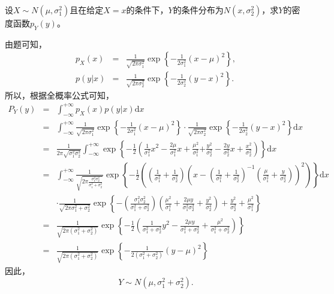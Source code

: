 \begin{example}
设$X\sim N(\mu,\sigma_{1}^{2})$且在给定$X = x$的条件下，$Y$的条件分布为$N(x,\sigma_{2}^{2})$，求$Y$的密度函数$p_{Y}(y)$。
\end{example}
\begin{solution}
由题可知，
\begin{eqnarray*}
    p_X(x) &=& \frac{1}{\sqrt{2\pi \sigma_1^2}} \exp\left\{-\frac{1}{2\sigma_1^2} (x-\mu)^2\right\},\\
    p(y|x) &=& \frac{1}{\sqrt{2\pi \sigma_2^2}}
    \exp\left\{-\frac{1}{2\sigma_2^2} (y-x)^2\right\}.
\end{eqnarray*}
所以，根据全概率公式可知，
\begin{eqnarray*}
P_{Y}(y)
&=&\int_{-\infty}^{+\infty}p_{X}(x)p(y  |  x) \text{d} x\\
&=&\int_{-\infty}^{+\infty} \frac{1}{\sqrt{2 \pi \sigma_{1}^{2}}} \exp \left\{-\frac{1}{2 \sigma_{1}^{2}}(x-\mu)^{2}\right\} \cdot \frac{1}{\sqrt{2 \pi \sigma_{2}^{2}}} \exp \left\{-\frac{1}{2 \sigma_{2}^{2}}(y-x)^{2}\right\} \text{d} x\\
&=&\frac{1}{2 \pi \sqrt{\sigma_{1}^{2} \sigma_{2}^{2}}} \int_{-\infty}^{+\infty} \exp \left\{-\frac{1}{2} \left(\frac{1}{\sigma_{1}^{2}} x^{2}-\frac{2 \mu}{\sigma_{1}^{2}} x+\frac{\mu^{2}}{\sigma_{1}^{2}}\right.\right.
\left.\left.+\frac{y^{2}}{\sigma_{2}^{2}}-\frac{2 y}{\sigma_{2}^{2}} x+\frac{x^{2}}{\sigma_{2}^{2}} \right)\right\} \text{d} x\\
&=& \int_{-\infty}^{+\infty} \frac{1}{\sqrt{2 \pi \frac{\sigma_{1}^{2} \sigma_{2}^{2}}{\sigma_{1}^{2}+\sigma_{2}^{2}}}} 
\exp \left\{-\frac{1}{2} \left(\left( \frac { 1 } { \sigma _ { 1 } ^ { 2 } } + \frac { 1 } { \sigma _ { 2 } ^ { 2 } } \right)
\left(x-\left(\frac{1}{\sigma_{1}^{2}}+\frac{1}{\sigma_{2}^{2}}\right)^{-1}\left(\frac{\mu}{\sigma_{1}^{2}}+\frac{y}{\sigma_{2}^{2}}\right)\right)^{2} \right)\right\}\text{d}x \\
&& \cdot \frac{1}{\sqrt{2 \pi\sigma_{1}^{2}+\sigma_{2}^{2}}}   \exp\left\{
-\left(\frac{\sigma_{1}^{2} \sigma_{2}^{2}}{\sigma_{1}^{2}+\sigma_{2}^{2}}\right)\left(\frac{\mu^{2}}{\sigma_{1}^{4}}+\frac{2 \mu y}{\sigma_{1}^{2} \sigma_{2}^{2}}+\frac{y^{2}}{\sigma_{2}^{4}}\right)+\frac{y^{2}}{\sigma_{2}^{2}}+\frac{\mu^{2}}{\sigma_{1}^{2}} \right\} \\
&=&\frac{1}{\sqrt{2 \pi\left(\sigma_{1}^{2}+\sigma_{2}^{2}\right)}} \exp \left\{-\frac{1}{2} \left(\frac{1}{\sigma_{1}^{2}+\sigma_{2}^{2}} y^{2}-\frac{2 \mu y}{\sigma_{1}^{2}+\sigma_{2}^{2}}+\frac{\mu^{2}}{\sigma_{1}^{2}+\sigma_{2}^{2}} \right)\right\}\\
&=&\frac{1}{\sqrt{2 \pi(\sigma_{1}^{2}+\sigma_{2}^{2})}} \exp \left\{-\frac{1}{2\left(\sigma_{1}^{2}+\sigma_{2}^{2}\right)}(y-\mu)^{2}\right\}
\end{eqnarray*}
因此，
$$Y\sim N(\mu,\sigma_{1}^{2}+\sigma_{2}^{2}).$$   
\end{solution}

